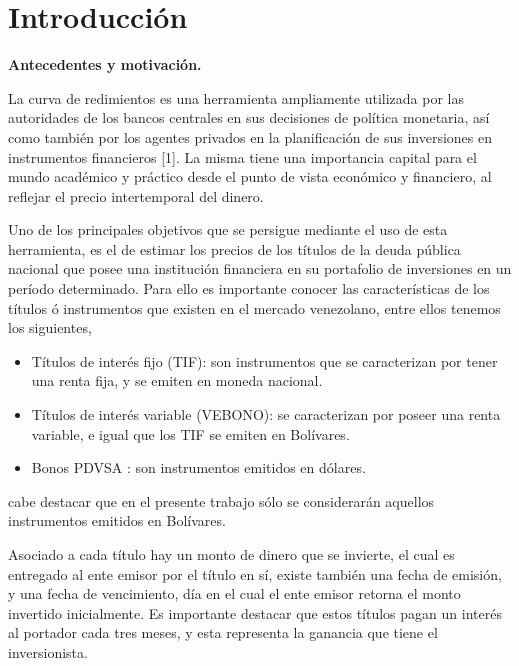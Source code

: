 \chapter*{Introducci\'on}

\textbf{Antecedentes y motivaci\'on. \\}

\hspace*{0.4 cm} La curva de redimientos es una herramienta ampliamente utilizada por las autoridades de los bancos centrales en sus decisiones de pol\'itica monetaria, as\'i como tambi\'en por los agentes privados en la planificaci\'on de sus inversiones en instrumentos financieros [1]. La misma tiene una importancia capital
para el mundo acad\'emico y pr\'actico desde el punto de vista econ\'omico y financiero, al reflejar el precio intertemporal del dinero.

\vspace{0.5cm}

\hspace*{0.4 cm} Uno de los principales objetivos que se persigue mediante el uso de esta herramienta, es el de estimar los precios de los t\'itulos de la deuda p\'ublica nacional que posee una instituci\'on financiera en su portafolio de inversiones en un per\'iodo determinado. Para ello es importante conocer las caracter\'isticas de los t\'itulos \'o instrumentos que existen en el mercado venezolano, entre ellos tenemos los siguientes,

\vspace{0.4cm}

\begin{itemize}
  \item T\'itulos de inter\'es fijo (TIF): son instrumentos que se caracterizan por tener una renta fija, y se emiten en moneda nacional.
  \item T\'itulos de inter\'es variable (VEBONO): se caracterizan por poseer una renta variable, e igual que los TIF se emiten en Bol\'ivares.
  \item Bonos PDVSA : son instrumentos emitidos en d\'olares.
\end{itemize}

\vspace{0.5cm}

\noindent cabe destacar que en el presente trabajo s\'olo  se considerar\'an aquellos instrumentos emitidos en Bol\'ivares.

\vspace{0.5cm}

\hspace*{0.4 cm}Asociado a cada t\'itulo hay un monto de dinero que se invierte, el cual es entregado al ente emisor por el t\'itulo en s\'i, existe tambi\'en una fecha de emisi\'on, y una fecha de vencimiento, d\'ia en el cual el ente emisor retorna el monto invertido inicialmente. Es importante destacar que estos t\'itulos pagan un inter\'es al portador cada tres meses, y esta representa la ganancia que tiene el inversionista.


